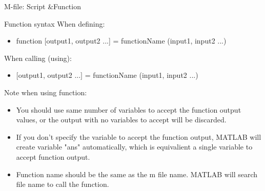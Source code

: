 \begin{frame}{M-file: Script \&Function}
\begin{block}{Function syntax}
When defining:
\begin{itemize}
\item function [output1, output2 ...] = functionName (input1, input2 ...)
\end{itemize}
When calling (using):
\begin{itemize}
\item $[$output1, output2 ...$]$ = functionName (input1, input2 ...)
\end{itemize}
\end{block}
Note when using function:
\begin{itemize}
\item You should use same number of variables to accept the function output values, or the output with no variables to accept will be discarded.
\item If you don't specify the variable to accept the function output, MATLAB will create variable "ans" automatically, which is equivalient a single variable to accept function output.
\item Function name should be the same as the m file name. MATLAB will search file name to call the function.
\end{itemize}
\end{frame}

